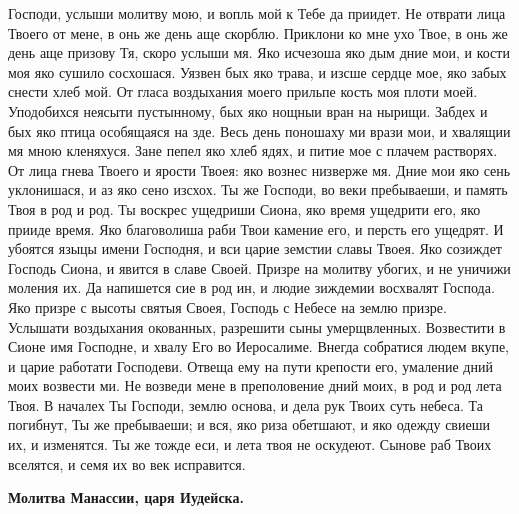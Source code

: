 Господи, услыши молитву мою, и вопль мой к Тебе да приидет. Не отврати лица Твоего от мене, в онь же день аще скорблю. Приклони ко мне ухо Твое, в онь же  день аще призову Тя, скоро услыши мя. Яко исчезоша яко дым дние мои, и кости моя яко сушило сосхошася. Уязвен бых яко трава, и изсше сердце мое, яко забых снести хлеб мой. От гласа воздыхания моего прильпе кость моя плоти моей. Уподобихся неясыти пустынному, бых яко нощныи вран на нырищи. Забдех и бых яко птица особящаяся на зде. Весь день поношаху ми врази мои, и хвалящии мя мною кленяхуся. Зане пепел яко хлеб ядях, и питие мое с плачем растворях. От лица гнева Твоего и ярости Твоея: яко вознес низверже мя. Дние мои яко сень уклонишася, и аз яко сено изсхох. Ты же Господи, во веки пребываеши, и память Твоя в род и род. Ты воскрес ущедриши Сиона, яко время ущедрити его, яко прииде время. Яко благоволиша раби Твои камение его, и персть его ущедрят. И убоятся языцы имени Господня, и вси царие земстии славы Твоея. Яко созиждет Господь Сиона, и явится в славе Своей. Призре на молитву убогих, и не уничижи моления их. Да напишется сие в род ин, и людие зиждемии восхвалят Господа. Яко призре с высоты святыя Своея, Господь с Небесе на землю призре. Услышати воздыхания окованных, разрешити сыны умерщвленных. Возвестити в Сионе имя Господне, и хвалу Его во Иеросалиме. Внегда собратися людем вкупе, и царие  работати Господеви. Отвеща ему на пути крепости его, умаление дний моих возвести ми. Не возведи мене в преполовение дний моих, в род и род лета Твоя. В началех Ты Господи, землю основа, и дела рук Твоих суть небеса. Та погибнут, Ты же пребываеши; и вся, яко риза обетшают, и яко одежду  свиеши их, и изменятся. Ты же тожде еси, и лета твоя не оскудеют. Сынове раб Твоих вселятся, и семя их во век исправится.


\medskip


\bfseries Молитва Манассии, царя Иудейска.\normalfont{}\nopagebreak


